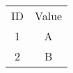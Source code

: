 \documentclass{article}
\begin{document}
\begin{table}[ht]
\centering
\caption{}
\begin{tabular} {cc}
ID & Value \\
1 & A \\
2 & B
\end{tabular}
\label{tab:noBorderTable}
\end{table}
\end{document}
